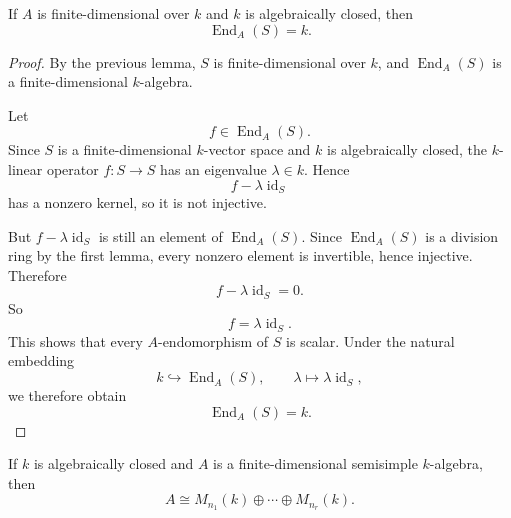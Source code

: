 \begin{lemma}
    If $A$ is finite-dimensional over $k$ and $k$ is algebraically closed, then
    \[
        \operatorname{End}_A(S)=k.
    \]
\end{lemma}

\begin{proof}
    By the previous lemma, $S$ is finite-dimensional over $k$, and
    $\operatorname{End}_A(S)$ is a finite-dimensional $k$-algebra.

    Let
    \[
        f\in \operatorname{End}_A(S).
    \]
    Since $S$ is a finite-dimensional $k$-vector space and $k$ is algebraically closed,
    the $k$-linear operator $f:S\to S$ has an eigenvalue $\lambda\in k$. Hence
    \[
        f-\lambda \operatorname{id}_S
    \]
    has a nonzero kernel, so it is not injective.

    But $f-\lambda \operatorname{id}_S$ is still an element of $\operatorname{End}_A(S)$.
    Since $\operatorname{End}_A(S)$ is a division ring by the first lemma, every nonzero
    element is invertible, hence injective. Therefore
    \[
        f-\lambda \operatorname{id}_S=0.
    \]
    So
    \[
        f=\lambda \operatorname{id}_S.
    \]
    This shows that every $A$-endomorphism of $S$ is scalar. Under the natural embedding
    \[
        k\hookrightarrow \operatorname{End}_A(S),
        \qquad
        \lambda\mapsto \lambda\operatorname{id}_S,
    \]
    we therefore obtain
    \[
        \operatorname{End}_A(S)=k.
    \]
\end{proof}

\begin{theorem}
    If $k$ is algebraically closed and $A$ is a finite-dimensional semisimple $k$-algebra, then
    \[
        A \cong M_{n_1}(k) \oplus \cdots \oplus M_{n_r}(k).
    \]
\end{theorem}

